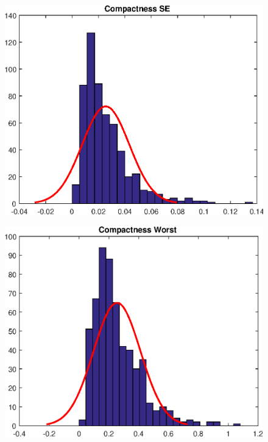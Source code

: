 \documentclass[11pt,a4paper]{article}
\numberwithin{equation}{section}
\begin{document}
\begin{itemize}
\begin{figure}[H]
\centering
\begin{minipage}{.5\textwidth}
  \centering
  \includegraphics[width=\linewidth]{./img/compactness_se}
  \label{fig:test1}
\end{minipage}%
\begin{minipage}{.5\textwidth}
  \centering
  \includegraphics[width=\linewidth]{./img/compactness_worst}
  \label{fig:test2}
\end{minipage}
\end{figure}


\end{itemize}
\end{document}
